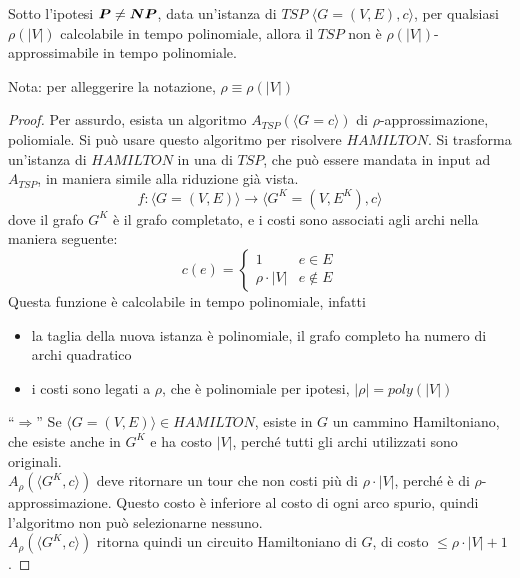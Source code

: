 \begin{theorem}
    \label{teo:inapprossimabilitatsp}
    Sotto l'ipotesi $\bm{P} \ne \bm{NP}$,
    data un'istanza di $TSP$
    $
        \langle
            G = (V,E), c
        \rangle
    $, per qualsiasi
    $
        \rho (|V|)
    $ calcolabile in tempo polinomiale,
    allora il $TSP$ non è $
        \rho (|V|)
    $-approssimabile in tempo polinomiale.
\end{theorem}
Nota: per alleggerire la notazione, $\rho \equiv \rho(|V|)$
\begin{proof}
    Per assurdo, esista un algoritmo $
    A_{TSP} ( \langle G = c \rangle)
    $ di
    $\rho$-approssimazione, poliomiale.
    Si può usare questo algoritmo per risolvere $HAMILTON$.
    Si trasforma un'istanza di $HAMILTON$ in una di $TSP$, che può essere mandata in input ad $A_{TSP}$, in maniera simile alla riduzione già vista.
    \begin{equation*}
        f :
        \langle
            G = (V,E)
        \rangle
        \to
        \langle
            G^K = (V,E^K), c
        \rangle
    \end{equation*}
    dove il grafo $G^K$ è il grafo completato, e i costi sono associati agli archi nella maniera seguente:
    \begin{equation*}
         c(e) = 
        \begin{cases}
            1 & e \in E \\
            \rho \cdot |V| & e \notin E
        \end{cases}
    \end{equation*}
    Questa funzione è calcolabile in tempo polinomiale, infatti
    \begin{itemize}[parsep=0pt,partopsep=0pt,topsep=2pt]
        \item la taglia della nuova istanza è polinomiale, il grafo completo ha numero di archi quadratico
        \item i costi sono legati a $\rho$, che è polinomiale per ipotesi, $|\rho| = poly (|V|)$
    \end{itemize}

    ``$\Rightarrow$''
    Se $ \langle G = (V,E) \rangle \in HAMILTON$, esiste in $G$ un cammino Hamiltoniano, che esiste anche in $G^K$ e ha costo $|V|$, perché tutti gli archi utilizzati sono originali.
    \\
    $A_{\rho} ( \langle G^K ,  c \rangle)$ deve ritornare un tour che non costi più di $\rho \cdot |V|$, perché è di $\rho $-approssimazione.
    Questo costo è inferiore al costo di ogni arco spurio, quindi l'algoritmo non può selezionarne nessuno.
    \\
    $A_{\rho} ( \langle G^K ,  c \rangle)$ ritorna quindi un circuito Hamiltoniano di $G$, di costo $ \leq \rho \cdot |V| + 1 $.


\end{proof}
